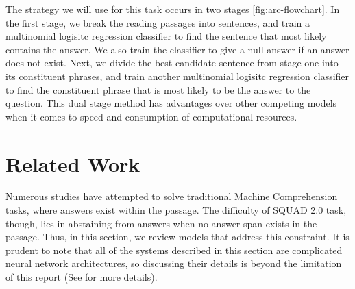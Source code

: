 The strategy we will use for this task occurs in two stages \ref{fig:arc-flowchart}. In the first stage, we break the reading passages into sentences, and train a multinomial logisitc regression classifier to find the sentence that most likely contains the answer. We also train the classifier to give a null-answer if an answer does not exist. Next, we divide the best candidate sentence from stage one into its constituent phrases, and train another multinomial logisitc regression classifier to find the constituent phrase that is most likely to be the answer to the question. This dual stage method has advantages over other competing models when it comes to speed and consumption of computational resources. 




\section{Related Work}

Numerous studies \citep{BahdanauBJGVB17, WangJ16a, XiongZS16} have attempted to solve traditional Machine Comprehension tasks, where answers exist within the passage. The difficulty of SQUAD 2.0 task, though, lies in abstaining from answers when no answer span exists in the passage. Thus, in this section, we review models that address this constraint. It is prudent to note that all of the systems described in this section are complicated neural network architectures, so discussing their details is beyond the limitation of this report (See  \citep{chen2018neural} for more details). 


